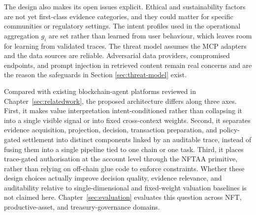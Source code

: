 The design also makes its open issues explicit. Ethical and sustainability factors are not yet first-class evidence categories, and they could matter for specific communities or regulatory settings. The intent profiles used in the operational aggregation $g_i$ are set rather than learned from user behaviour, which leaves room for learning from validated traces. The threat model assumes the MCP adapters and the data sources are reliable. Adversarial data providers, compromised endpoints, and prompt injection in retrieved content remain real concerns and are the reason the safeguards in Section \ref{sec:threat-model} exist.

Compared with existing blockchain-agent platforms reviewed in Chapter~\ref{sec:relatedwork}, the proposed architecture differs along three axes. First, it makes value interpretation intent-conditioned rather than collapsing it into a single visible signal or into fixed cross-context weights. Second, it separates evidence acquisition, projection, decision, transaction preparation, and policy-gated settlement into distinct components linked by an auditable trace, instead of fusing them into a single pipeline tied to one chain or one task. Third, it places trace-gated authorisation at the account level through the NFTAA primitive, rather than relying on off-chain glue code to enforce constraints. Whether these design choices actually improve decision quality, evidence relevance, and auditability relative to single-dimensional and fixed-weight valuation baselines is not claimed here. Chapter~\ref{sec:evaluation} evaluates this question across NFT, productive-asset, and treasury-governance domains.

